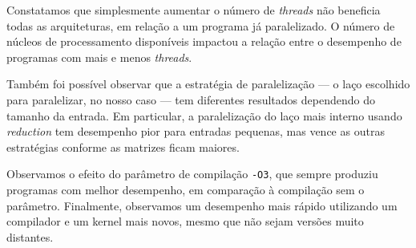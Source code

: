 \documentclass[a4paper, 12pt]{article}
\begin{document}
Constatamos que simplesmente aumentar o número de \textit{threads}
não beneficia todas as arquiteturas, em relação a um programa
já paralelizado. O número de núcleos de processamento disponíveis
impactou a relação entre o desempenho de programas com mais e
menos \textit{threads}.

Também foi possível observar que a estratégia de paralelização ---
o laço escolhido para paralelizar, no nosso caso --- tem diferentes
resultados dependendo do tamanho da entrada. Em particular, a
paralelização do laço mais interno usando \textit{reduction}
tem desempenho pior para entradas pequenas, mas vence as outras
estratégias conforme as matrizes ficam maiores.

Observamos o efeito do parâmetro de compilação \texttt{-O3},
que sempre produziu programas com melhor desempenho, em comparação à
compilação sem o parâmetro. Finalmente, observamos um desempenho mais
rápido utilizando um compilador e um kernel mais novos, mesmo que
não sejam versões muito distantes.

%
%
\end{document}
